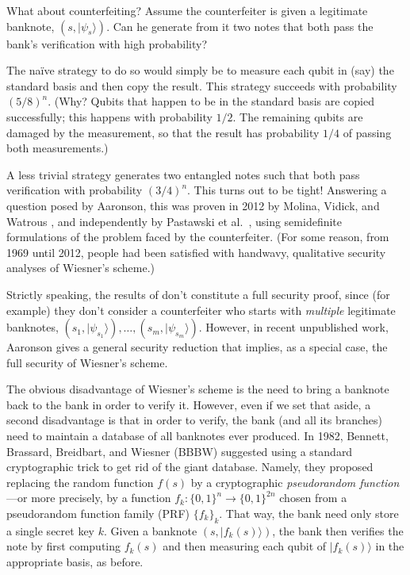 \documentclass[12pt]{report}
\theoremstyle{plain}
\theoremstyle{definition}
\renewcommand{\ket}[1]{|#1\rangle}
\begin{document}
What about counterfeiting?  Assume the counterfeiter is given a legitimate banknote, $(s,\ket{\psi_s})$.  Can he generate from it two notes that both pass the bank's verification with high probability?

The na\"{i}ve strategy to do so would simply be to measure each qubit in (say) the standard basis and then copy the result.  This strategy succeeds with probability $(5/8)^n$. (Why? Qubits that happen to be in the standard basis are copied successfully; this happens with probability $1/2$.  The remaining qubits are damaged by the measurement, so that the result has probability $1/4$ of passing both measurements.)

A less trivial strategy generates two entangled notes such that both pass verification with probability $(3/4)^n$.  This turns out to be tight!  Answering a question posed by Aaronson, this was proven in 2012 by Molina, Vidick, and Watrous \cite{mvw}, and independently by Pastawski et al.\ \cite{pastawski}, using semidefinite formulations of the problem faced by the counterfeiter.  (For some reason, from 1969 until 2012, people had been satisfied with handwavy, qualitative security analyses of Wiesner's scheme.)

Strictly speaking, the results of \cite{mvw,pastawski} don't constitute a full security proof, since (for example) they don't consider a counterfeiter who starts with {\em multiple} legitimate banknotes, $(s_1,\ket{\psi_{s_1}}),\ldots,(s_m,\ket{\psi_{s_m}})$.  However, in recent unpublished work, Aaronson gives a general security reduction that implies, as a special case, the full security of Wiesner's scheme.

The obvious disadvantage of Wiesner's scheme is the need to bring a banknote back to the bank in order to verify it.  However, even if we set that aside, a second disadvantage is that in order to verify, the bank (and all its branches) need to maintain a database of all banknotes ever produced.
In 1982, Bennett, Brassard, Breidbart, and Wiesner (BBBW) \cite{bbbw} suggested using a standard cryptographic trick to get rid of the giant database. Namely, they proposed replacing the random function $f(s)$ by a cryptographic \emph{pseudorandom function}---or more precisely, by a function $f_k:\{0,1\}^n\longrightarrow \{0,1\}^{2n}$ chosen from a pseudorandom function family (PRF) $\{f_k\}_k$.  That way, the bank need only store a single secret key $k$.  Given a banknote $(s,\ket{f_k(s)})$, the bank then verifies the note by first computing $f_k(s)$ and then measuring each qubit of $\ket{f_k(s)}$ in the appropriate basis, as before.
\end{document}
